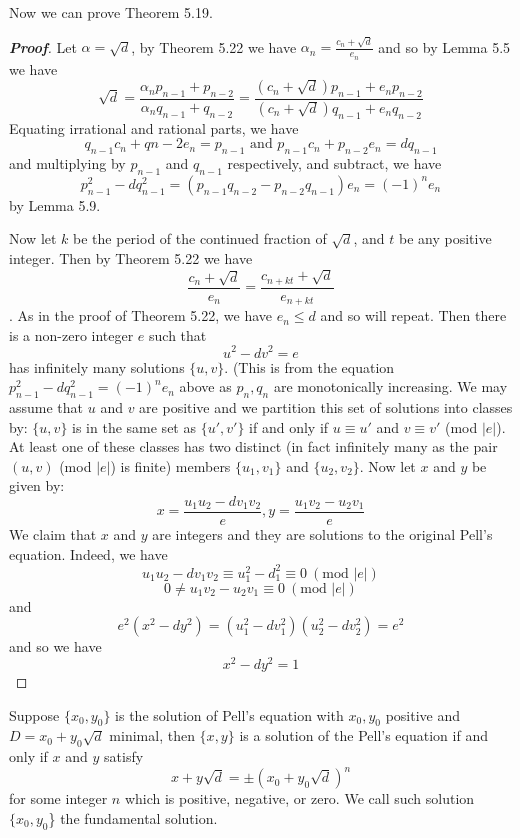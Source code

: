 Now we can prove Theorem 5.19.
\begin{proof}[\bf Proof] Let $\alpha=\sqrt{d}$, by Theorem 5.22 we have $\alpha_n=\frac{c_n+\sqrt{d}}{e_n}$ and so
by Lemma 5.5 we have
$$\sqrt{d}=\frac{\alpha_n p_{n-1}+p_{n-2}}{\alpha_n q_{n-1}+q_{n-2}}
=\frac{(c_n+\sqrt{d})p_{n-1}+e_np_{n-2}}{(c_n+\sqrt{d})q_{n-1}+e_nq_{n-2}}$$
Equating irrational and rational parts, we have
$$q_{n-1}c_n+q{n-2}e_n=p_{n-1} \text{ and } p_{n-1}c_n+p_{n-2}e_n=dq_{n-1}$$
and multiplying by $p_{n-1}$ and $q_{n-1}$ respectively, and subtract, we have
$$p^2_{n-1}-dq^2_{n-1}=(p_{n-1}q_{n-2}-p_{n-2}q_{n-1}) e_n=(-1)^n e_n$$
by Lemma 5.9.

Now let $k$ be the period of the continued fraction of $\sqrt{d}$, and $t$ be any positive integer.
Then by Theorem 5.22 we have
$$\frac{c_n+\sqrt{d}}{e_n}=\frac{c_{n+kt}+\sqrt{d}}{e_{n+kt}}$$. As in the proof of Theorem 5.22,
we have $e_n \le d$ and so will repeat. Then there is a non-zero integer $e$ such that
$$u^2-dv^2=e$$ has infinitely many solutions $\{u,v\}$.
(This is from the equation $p^2_{n-1}-dq^2_{n-1}=(-1)^n e_n$ above as $p_n,q_n$ are monotonically increasing.
We may assume that $u$ and $v$ are positive and we partition this set of solutions into classes by:
$\{u,v\}$ is in the same set as $\{u',v'\}$ if and only if
$u \equiv u'$ and $v \equiv v'$ (mod $|e|$). At least one of these classes has two distinct
(in fact infinitely many as the pair $(u,v)$ (mod $|e|$) is finite) members $\{u_1,v_1\}$ and $\{u_2,v_2\}$. Now let $x$ and $y$ be given by:
$$x=\frac{u_1 u_2 -d v_1 v_2}{e}, y=\frac{u_1v_2-u_2 v_1}{e}$$
We claim that $x$ and $y$ are integers and they are solutions to the original Pell's equation.
Indeed, we have
$$u_1 u_2-dv_1v_2 \equiv u^2_1 -d^2_1 \equiv 0~(\text{mod } |e|)$$
$$0 \neq u_1v_2-u_2v_1 \equiv 0~(\text{mod } |e|)$$
and
$$e^2(x^2-dy^2)=(u^2_1-dv^2_1)(u^2_2-dv^2_2)=e^2$$
and so we have
$$x^2-dy^2=1$$
\end{proof}
\begin{theorem} Suppose $\{x_0,y_0\}$ is the solution of Pell's equation with $x_0,y_0$ positive and
$D=x_0+y_0\sqrt{d}$ minimal, then $\{x,y\}$ is a solution of the Pell's equation if and only if
$x$ and $y$ satisfy
$$x+y\sqrt{d}=\pm (x_0+y_0\sqrt{d})^n$$
for some integer $n$ which is positive, negative, or zero. We call such solution $\{x_0,y_0$\} the fundamental solution.
\end{theorem}

